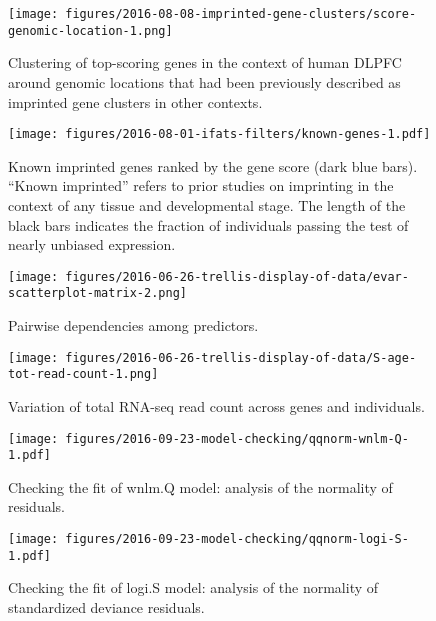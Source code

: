 \documentclass[letterpaper]{article}
\begin{document}
\begin{figure}
\begin{center}
\texttt{[image: figures/2016-08-08-imprinted-gene-clusters/score-genomic-location-1.png]}
\end{center}
\caption{
Clustering of top-scoring genes in the context of human DLPFC around genomic locations that
had been previously described as imprinted gene clusters in other contexts.
}
\label{fig:clusters}
\end{figure}

\begin{figure}
\begin{center}
\texttt{[image: figures/2016-08-01-ifats-filters/known-genes-1.pdf]}
\caption{Known imprinted genes ranked by the gene score (dark blue bars).
``Known imprinted'' refers to prior studies on imprinting in the context of
any tissue and developmental stage.  The length of the
black bars indicates the fraction of individuals passing the test of nearly
unbiased expression.}
\label{fig:known-genes}
\end{center}
\end{figure}

\begin{figure}
\begin{center}
\texttt{[image: figures/2016-06-26-trellis-display-of-data/evar-scatterplot-matrix-2.png]}
\end{center}
\caption{
Pairwise dependencies among predictors.
}
\label{fig:predictor-associations}
\end{figure}

\begin{figure}
\begin{center}
\texttt{[image: figures/2016-06-26-trellis-display-of-data/S-age-tot-read-count-1.png]}
\end{center}
\caption{Variation of total RNA-seq read count across genes and individuals.}
\label{fig:weight-of-evidence}
\end{figure}

\begin{figure}
\begin{center}
\texttt{[image: figures/2016-09-23-model-checking/qqnorm-wnlm-Q-1.pdf]}
\end{center}
\caption{
Checking the fit of wnlm.Q model: analysis of the normality of residuals.
}
\label{fig:qqnorm-wnlm.Q}
\end{figure}

\begin{figure}
\begin{center}
\texttt{[image: figures/2016-09-23-model-checking/qqnorm-logi-S-1.pdf]}
\end{center}
\caption{
Checking the fit of logi.S model: analysis of the normality of standardized deviance residuals.
}
\label{fig:qqnorm-logi.S}
\end{figure}
\end{document}
